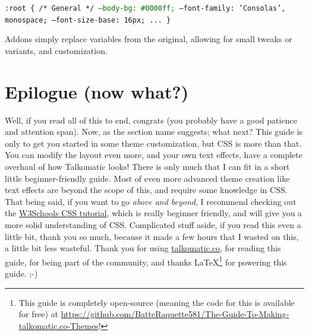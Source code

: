 \documentclass{article}
\begin{document}
\begin{tcolorbox}[colback=green!5!white,colframe=green!75!black,title=Combined theme with blue-addon.css]
  \texttt{:root \{ \newline
  /* General */ \newline
  \textcolor{green}{--body-bg: \#0000ff;} \newline
  --font-family: 'Consolas', monospace; \newline
  --font-size-base: 16px; \newline
  ... \newline \}}
\end{tcolorbox}

Addons simply replace variables from the original, allowing for small tweaks or variants, and customization.


\section{Epilogue (now what?)}

Well, if you read all of this to end, congrats (you probably have a good patience and attention span). Now, as the section name suggests; what next? This guide is only to get you started in some theme customization, but CSS is more than that. You can modify the layout even more, and your own text effects, have a complete overhaul of how Talkomatic looks! There is only much that I can fit in a short little beginner-friendly guide. Most of even more advanced theme creation like text effects are beyond the scope of this, and require some knowledge in CSS. That being said, if you want to go \textit{above and beyond}, I recommend checking out the \href{https://www.w3schools.com/css/}{W3Schools CSS tutorial}, which is really beginner friendly, and will give you a more solid understanding of CSS. Complicated stuff aside, if you read this even a little bit, thank you so much, because it made a few hours that I wasted on this, a little bit less wasteful. Thank you for using \url{talkomatic.co}, for reading this guide, for being part of the community, and thanks \LaTeX\footnote{This guide is completely open-source (meaning the code for this is available for free) at \url{https://github.com/BatteRaquette581/The-Guide-To-Making-talkomatic.co-Themes}!} for powering this guide. ;-)
\end{document}

